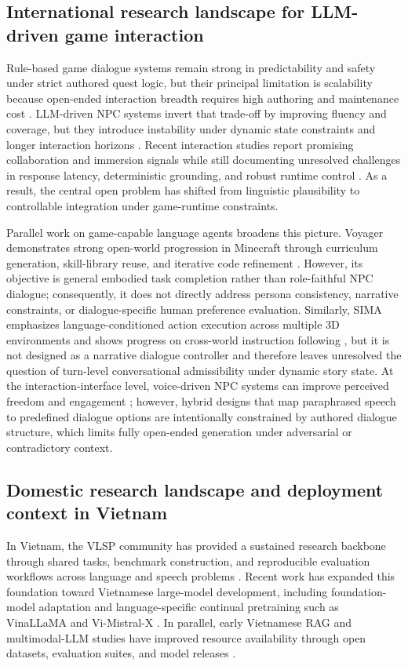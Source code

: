 ﻿\documentclass[a4paper,12pt]{article}
\begin{document}
\subsection{International research landscape for LLM-driven game interaction}
Rule-based game dialogue systems remain strong in predictability and safety under strict authored quest logic, but their principal limitation is scalability because open-ended interaction breadth requires high authoring and maintenance cost \cite{Gallotta2024Survey,Sweetser2024Scoping}. LLM-driven NPC systems invert that trade-off by improving fluency and coverage, but they introduce instability under dynamic state constraints and longer interaction horizons \cite{Park2023GenerativeAgents,Gallotta2024Survey,Sweetser2024Scoping}. Recent interaction studies report promising collaboration and immersion signals while still documenting unresolved challenges in response latency, deterministic grounding, and robust runtime control \cite{Rao2024Minecraft,Christiansen2024Presence}. As a result, the central open problem has shifted from linguistic plausibility to controllable integration under game-runtime constraints.

Parallel work on game-capable language agents broadens this picture. Voyager demonstrates strong open-world progression in Minecraft through curriculum generation, skill-library reuse, and iterative code refinement \cite{Wang2023Voyager}. However, its objective is general embodied task completion rather than role-faithful NPC dialogue; consequently, it does not directly address persona consistency, narrative constraints, or dialogue-specific human preference evaluation. Similarly, SIMA emphasizes language-conditioned action execution across multiple 3D environments and shows progress on cross-world instruction following \cite{DeepMind2024SIMA}, but it is not designed as a narrative dialogue controller and therefore leaves unresolved the question of turn-level conversational admissibility under dynamic story state. At the interaction-interface level, voice-driven NPC systems can improve perceived freedom and engagement \cite{Wevelsiep2025Voice}; however, hybrid designs that map paraphrased speech to predefined dialogue options are intentionally constrained by authored dialogue structure, which limits fully open-ended generation under adversarial or contradictory context.

\subsection{Domestic research landscape and deployment context in Vietnam}
In Vietnam, the VLSP community has provided a sustained research backbone through shared tasks, benchmark construction, and reproducible evaluation workflows across language and speech problems \cite{VLSP2025Proceedings,Ha2025VLSPSemanticParsing}. Recent work has expanded this foundation toward Vietnamese large-model development, including foundation-model adaptation and language-specific continual pretraining such as VinaLLaMA and Vi-Mistral-X \cite{VinaLLaMA2023,ViMistralX2024}. In parallel, early Vietnamese RAG and multimodal-LLM studies have improved resource availability through open datasets, evaluation suites, and model releases \cite{Duc2024VietnamRAG,LaVy2024}.
\end{document}
